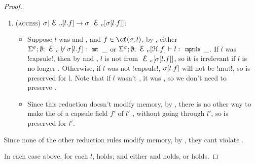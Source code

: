 \begin{proof}
\begin{ienumerate}
\begin{enumerate}
		
		\item (\textsc{access}) $\s|\EV[l.f]\rightarrow \s|\EV[\s[l.f]]$:
		\begin{itemize}
			\item Suppose $l$ was \WE and \NCM, and $f \in \cf(\s, l)$, by , either $\Ss; \emptyset; \EV \nvdash \s[l.f] : \Kw{mut}\,\_$ or $\Ss; \emptyset; \EV[\h.f] \vdash l : \Kw{capsule}\,\_$. If $l$ was \Q!capsule!, then by  and \HNC, $l$ is not \reach from $\EV[\s[l.f]]$, so it is irrelevant if $l$ is no longer \WE. Otherwise, if $l$ was not \Q!capsule!, $\sigma[l.f]$ will not be \Q!mut!, so \WE is preserved for l. Note that if $l$ wasn't \NCM, it was \HNO, so we don't need to preserve \WE. 
			\item Since this reduction doesn't modify memory, by , there is no other way to make the \rog of a capsule field $f'$ of $l'$ \muty, without going through $l'$, so \WE is preserved for $l'$.
		\end{itemize}
	\end{enumerate}
	
	\item Since none of the other reduction rules modify memory, by , they cant violate \WE.
	
\end{ienumerate}

\noindent In each case above, for each $l$, \HNC holds; and either \WE and \NCM holds, or \HNO holds.
\end{proof}

